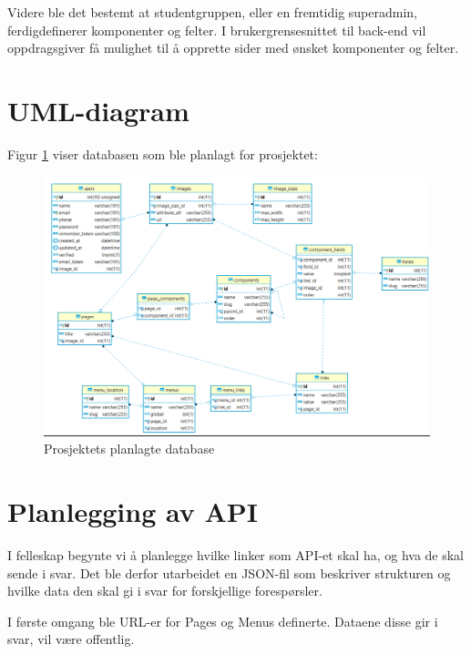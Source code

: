 Videre ble det bestemt at studentgruppen, eller en fremtidig superadmin, ferdigdefinerer komponenter og felter. I brukergrensesnittet til back-end vil oppdragsgiver få mulighet til å opprette sider med ønsket komponenter og felter.  

\section{UML-diagram}
Figur \ref{fig:database} viser databasen som ble planlagt for prosjektet:
\begin{figure}[H]
    \centering
    \includegraphics[width=\textwidth]{planlegging-av-database.png}
    \caption{Prosjektets planlagte database}
    \label{fig:database}
\end{figure}

\section{Planlegging av API}
I felleskap begynte vi å planlegge hvilke linker som API-et skal ha, og hva de skal sende i svar. Det ble derfor utarbeidet en JSON-fil som beskriver strukturen og hvilke data den skal gi i svar for forskjellige forespørsler.

I første omgang ble URL-er for Pages og Menus definerte. Dataene disse gir i svar, vil være offentlig. 







